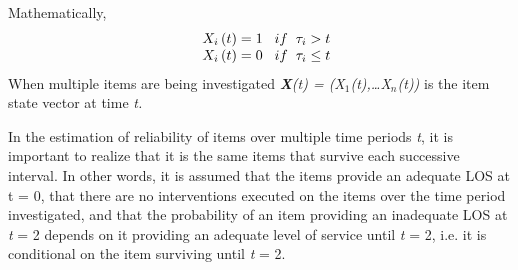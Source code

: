 Mathematically,
\begin{eqnarray}
&& \begin{array}{l}
{X_i}\left( t \right) = 1\;\hspace{2mm}if \hspace{2mm}{\tau _i} > t\\
{X_i}\left( t \right) = 0\;\hspace{2mm}if\hspace{2mm}{\tau _i} \le t
\end{array}
\label{eqreliability:2}
\end{eqnarray}
When multiple items are being investigated \textit{\textbf{X}(t) =
(X$_{1}$(t),\ldots{}X$_{n}$(t)) }is the item state vector at time \textit{t.}

In the estimation of reliability of items over multiple time periods \textit{t},
it is important to realize that it is the same items that survive each successive
interval. In other words, it is assumed that the items provide an adequate LOS at
t = 0, that there are no interventions executed on the items over the time period
investigated, and that the probability of an item providing an inadequate LOS at
\textit{t} = 2 depends on it providing an adequate level of service until
\textit{t} = 2, i.e. it is conditional on the item surviving until \textit{t} =
2.
